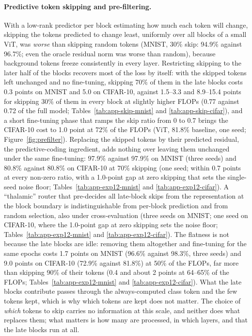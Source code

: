 \documentclass[11pt]{article}
\begin{document}
\paragraph{Predictive token skipping and pre-filtering.} With a low-rank predictor per block estimating how much each token
will change, skipping the tokens predicted to change least, uniformly over all blocks of a small ViT, was \emph{worse} than
skipping random tokens (MNIST, 30\% skip: 94.9\% against 96.7\%; even the oracle residual norm was worse than random), because
background tokens freeze consistently in every layer. Restricting skipping to the later half of the blocks recovers most of
the loss by itself: with the skipped tokens left unchanged and no fine-tuning, skipping 70\% of them in the late blocks costs
0.3 points on MNIST and 5.0 on CIFAR-10, against 1.5--3.3 and 8.9--15.4 points for skipping 30\% of them in every block at
slightly higher FLOPs (0.77 against 0.72 of the full model; Tables~\ref{tab:app-skip-mnist} and \ref{tab:app-skip-cifar}),
and a short
fine-tuning phase that ramps the skip ratio from 0 to 0.7 brings the CIFAR-10 cost to 1.0 point at 72\% of the FLOPs (ViT,
81.8\% baseline, one seed; Figure~\ref{fig:prefilter}). Replacing the skipped tokens by their predicted residual, the
predictive-coding ingredient, adds nothing over leaving them unchanged under the same fine-tuning: 97.9\% against 97.9\% on
MNIST (three seeds) and 80.8\% against 80.8\% on CIFAR-10 at 70\% skipping (one seed; within 0.7 points at every
non-zero ratio, with a 1.0-point gap at zero skipping that sets the single-seed noise floor;
Tables~\ref{tab:app-exp12-mnist} and \ref{tab:app-exp12-cifar}). A ``thalamic'' router that pre-decides all late-block skips from the representation at the block boundary is indistinguishable
from per-block prediction and from random selection, also under cross-evaluation (three seeds on MNIST; one seed on CIFAR-10,
where the 1.0-point gap at zero skipping sets the noise floor;
Tables~\ref{tab:app-exp12-mnist} and \ref{tab:app-exp12-cifar}). The flatness is not because the late blocks are
idle: removing them altogether and fine-tuning for the same epochs costs 1.7 points on MNIST (96.6\% against 98.3\%, three
seeds) and 9.0 points on CIFAR-10 (72.9\% against 81.8\%) at 50\% of the FLOPs, far more than skipping 90\% of their tokens
(0.4 and about 2 points at 64--65\% of the FLOPs; Tables~\ref{tab:app-exp12-mnist} and \ref{tab:app-exp12-cifar}). What the
late blocks contribute passes through the always-computed class token and the few tokens kept, which is why which tokens
are kept does not matter. The choice of \emph{which} tokens to skip carries no information at this scale, and neither does
what replaces them; what matters is how many are processed, in which layers, and that the late blocks run at all.
\end{document}
